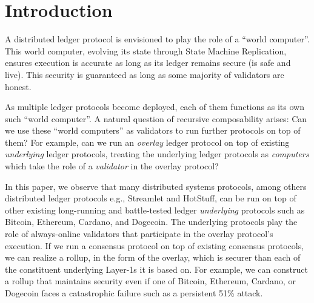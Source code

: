 
\section{Introduction}

A distributed ledger protocol is envisioned to play the role of a ``world computer''.
This world computer, evolving its state through State Machine Replication, ensures
execution is accurate as long as its ledger remains secure (is safe and live).
This security is guaranteed as long as some majority of validators are honest.

As multiple ledger protocols become deployed, each of them functions as its own
such ``world computer''. A natural question of recursive composability arises:
Can we use these ``world computers'' as validators to run further protocols on
top of them? For example, can we run an \emph{overlay} ledger protocol on top
of existing \emph{underlying} ledger protocols, treating the underlying ledger
protocols as \emph{computers} which take the role of a \emph{validator} in the
overlay protocol?

In this paper, we observe that many distributed systems protocols, among others
distributed ledger protocols e.g., Streamlet and HotStuff, can be run
on top of other existing long-running and battle-tested ledger \emph{underlying}
protocols such as Bitcoin, Ethereum, Cardano, and Dogecoin. The underlying protocols
play the role of always-online validators that participate in the overlay protocol's
execution. If we run a consensus protocol on top of existing consensus protocols,
we can realize a rollup, in the form of the overlay, which is securer than each
of the constituent underlying Layer-1s it is based on. For example, we can construct
a rollup that maintains security even if one of Bitcoin, Ethereum, Cardano, or Dogecoin
faces a catastrophic failure such as a persistent 51\% attack.

